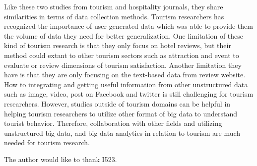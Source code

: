 \documentclass[sigconf]{acmart}
\begin{document}
Like these two studies from tourism and hospitality journals, they share similarities in terms of data collection methods. Tourism researchers has recognized the importance of user-generated data which was able to provide them the volume of data they need for better generalization. One limitation of these kind of tourism research is that they only focus on hotel reviews, but their method could extant to other tourism sectors such as attraction and event to evaluate or review dimensions of tourism satisfaction. Another limitation they have is that they are only focusing on the text-based data from review website. How to integrating and getting useful information from other unstructured data such as image, video, post on Facebook and twitter is still challenging for tourism researchers. However, studies outside of tourism domains can be helpful in helping tourism researchers to utilize other format of big data to understand tourist behavior. Therefore, collaboration with other fields and utilizing unstructured big data, and big data analytics in relation to tourism are much needed for tourism research. 


\begin{acks}

  The author would like to thank I523.

\end{acks}


 
\end{document}
